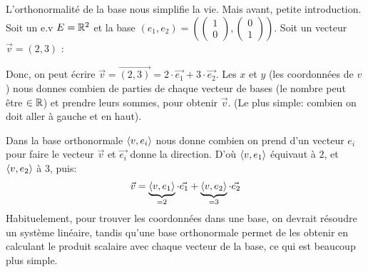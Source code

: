 \begin{intuition}
    L'orthonormalité de la base nous simplifie la vie. Mais avant, petite introduction. Soit un e.v $E = \mathbb{R}^2$ et la base $(e_1, e_2) = (\begin{pmatrix} 1 \\ 0 \end{pmatrix}, \begin{pmatrix} 0\\ 1 \end{pmatrix})$. Soit un vecteur $\vec{v} = (2, 3)$ :
    \begin{center}
    \end{center}
    Donc, on peut écrire $\vec{v} = \vec{(2, 3)} = 2 \cdot \vec{e_1} + 3 \cdot \vec{e_2}$. Les $x$ et  $y$ (les coordonnées de $v$) nous donnes combien de parties de chaque vecteur de bases (le nombre peut être $\in \mathbb{R}$) et prendre leurs sommes, pour obtenir $\vec{v}$. (Le plus simple: combien on doit aller à gauche et en haut).
    \par
    Dans la base orthonormale $\left\langle v, e_i \right\rangle$ nous donne combien on prend d'un vecteur $e_i$ pour faire le vecteur  $\vec{v}$ et  $\vec{e_i}$ donne la direction. D'où $\left\langle v, e_1 \right\rangle$ équivaut à $2$, et  $\left\langle v, e_2 \right\rangle$ à  $3$, puis: 
   \[
       \vec{v} = \underbrace{\left\langle v, e_1 \right\rangle}_{= 2} \cdot \vec{e_1} + \underbrace{\left\langle v, e_2 \right\rangle}_{= 3} \cdot \vec{e_2}
   \]  
   Habituelement, pour trouver les coordonnées dans une base, on devrait résoudre un système linéaire, tandis qu’une base orthonormale permet de les obtenir en calculant le produit scalaire avec chaque vecteur de la base, ce qui est beaucoup plus simple.
\end{intuition}
